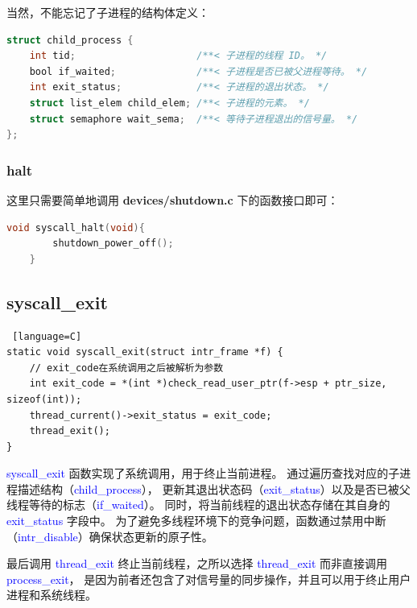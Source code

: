 \documentclass[14pt,a4paper,UTF8,twoside]{article}
\renewcommand{\texttt}[1]{\textcolor{blue}{\ttfamily #1}}
\begin{document}
当然，不能忘记了子进程的结构体定义：

\begin{lstlisting}[language=C,title= child\_process]
struct child_process {
    int tid;                     /**< 子进程的线程 ID。 */
    bool if_waited;              /**< 子进程是否已被父进程等待。 */
    int exit_status;             /**< 子进程的退出状态。 */
    struct list_elem child_elem; /**< 子进程的元素。 */
    struct semaphore wait_sema;  /**< 等待子进程退出的信号量。 */
};
\end{lstlisting}

\subsubsection{halt}

这里只需要简单地调用 \textbf{devices/shutdown.c} 下的函数接口即可：

\begin{lstlisting}[language=C]
    void syscall_halt(void){
        shutdown_power_off();
    }
\end{lstlisting}

\subsection{syscall\_exit}

\begin{lstlisting} [language=C]
static void syscall_exit(struct intr_frame *f) {
    // exit_code在系统调用之后被解析为参数
    int exit_code = *(int *)check_read_user_ptr(f->esp + ptr_size, sizeof(int));
    thread_current()->exit_status = exit_code;
    thread_exit();
}
\end{lstlisting}

\vspace{0.8cm}

\begin{ctt}
\texttt{syscall\_exit} 函数实现了系统调用，用于终止当前进程。
通过遍历查找对应的子进程描述结构（\texttt{child\_process}），
更新其退出状态码（\texttt{exit\_status}）以及是否已被父线程等待的标志（\texttt{if\_waited}）。
同时，将当前线程的退出状态存储在其自身的 \texttt{exit\_status} 字段中。
为了避免多线程环境下的竞争问题，函数通过禁用中断（\texttt{intr\_disable}）确保状态更新的原子性。

\vspace{0.5cm}

最后调用 \texttt{thread\_exit} 终止当前线程，之所以选择 \texttt{thread\_exit} 而非直接调用 \texttt{process\_exit}，
是因为前者还包含了对信号量的同步操作，并且可以用于终止用户进程和系统线程。
\end{ctt}
\end{document}
